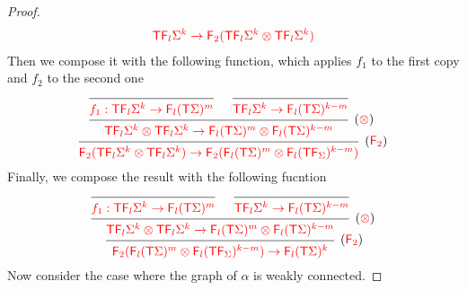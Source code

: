 \begin{proof}
\begin{align*}
{\color{red}{{\color{red}{\mathsf T}}{\color{red}{\mathsf F_{l}}}\Sigma^k\to {\color{red}{\mathsf F_{2}}}({\color{red}{\mathsf T}}{\color{red}{\mathsf F_{l}}}\Sigma^k\otimes {\color{red}{\mathsf T}}{\color{red}{\mathsf F_{l}}}\Sigma^k)}}
\end{align*}
Then we compose it with the following function, which applies $f_1$ to the first copy and $f_2$ to the second one
\begin{align*}
\begin{prooftree}
\Infer{0}[]{\ranked{f_1:\tmonad \reduce l \Sigma^k\to\reduce l (\tmonad \Sigma)^m}}
\Infer{0}[]{\ranked{ \tmonad \reduce l \Sigma^k\to \reduce l(\tmonad \Sigma)^{k-m}}}
\Infer{2}[$(\ranked{\otimes})$]{\ranked{\tmonad \reduce l \Sigma^k\otimes \tmonad \reduce l \Sigma^k\to\reduce l(\tmonad  \Sigma)^m\otimes \reduce l(\tmonad  \Sigma)^{k-m}}}
\Infer{1}[$(\reduce 2)$]{\ranked{\reduce 2 (\tmonad \reduce l \Sigma^k\otimes \tmonad \reduce l \Sigma^k)\to \reduce 2 ( \reduce l (\tmonad  \Sigma)^m\otimes \reduce l (\tmonad \reduce\Sigma)^{k-m})}}
\end{prooftree}
\end{align*}
Finally, we compose the result with the following fucntion 
\begin{align*}
\begin{prooftree}
\Infer{0}[]{\ranked{f_1:\tmonad \reduce l \Sigma^k\to\reduce l (\tmonad \Sigma)^m}}
\Infer{0}[]{\ranked{ \tmonad \reduce l \Sigma^k\to \reduce l(\tmonad \Sigma)^{k-m}}}
\Infer{2}[$(\ranked{\otimes})$]{\ranked{\tmonad \reduce l \Sigma^k\otimes \tmonad \reduce l \Sigma^k\to\reduce l(\tmonad  \Sigma)^m\otimes \reduce l(\tmonad  \Sigma)^{k-m}}}
\Infer{1}[$(\reduce 2)$]{\ranked{ \reduce 2 ( \reduce l (\tmonad  \Sigma)^m\otimes \reduce l (\tmonad \reduce\Sigma)^{k-m})\to \reduce l (\tmonad \Sigma)^k}}
\end{prooftree}
\end{align*}
Now consider the case where the graph of $\alpha$ is weakly connected. 


\end{proof}
